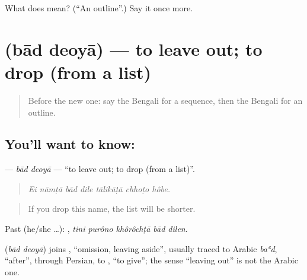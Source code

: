 \begin{tcolorbox}[breakable,colback=teal!4,colframe=teal!35!black,title={Before you move on}]
What does  mean? (\textquotedblleft{}An outline\textquotedblright{}.) Say it once more.
\end{tcolorbox}
\section[\texorpdfstring{\bn{বাদ} \bn{দেওয়া} (bād deoyā)}{বাদ দেওয়া (bād deoyā)}]{  (bād deoyā) — to leave out; to drop (from a list)}

\label{lesson:BN-C531-bad-deoya}



\begin{quote}
Before the new one: say the Bengali for a sequence, then the Bengali for an outline.
\end{quote}

\subsection*{You'll want to know:  }
\textbf{ } — \emph{bād deoyā} — \textquotedblleft{}to leave out; to drop (from a list)\textquotedblright{}.

\begin{quote}
      
\end{quote}

\begin{quote}
\emph{Ei nāmṭā bād dile tālikāṭā chhoṭo hôbe.}
\end{quote}

\begin{quote}
If you drop this name, the list will be shorter.
\end{quote}

Past (he/she …):     , \emph{tini purôno khôrôchṭā bād dilen}.

\begin{cousinweb}
\textbf{ } (\emph{bād deoyā}) joins , \textquotedblleft{}omission, leaving aside\textquotedblright{}, usually traced to Arabic \emph{baʿd}, \textquotedblleft{}after\textquotedblright{}, through Persian, to , \textquotedblleft{}to give\textquotedblright{}; the sense \textquotedblleft{}leaving out\textquotedblright{} is not the Arabic one.
\end{cousinweb}

